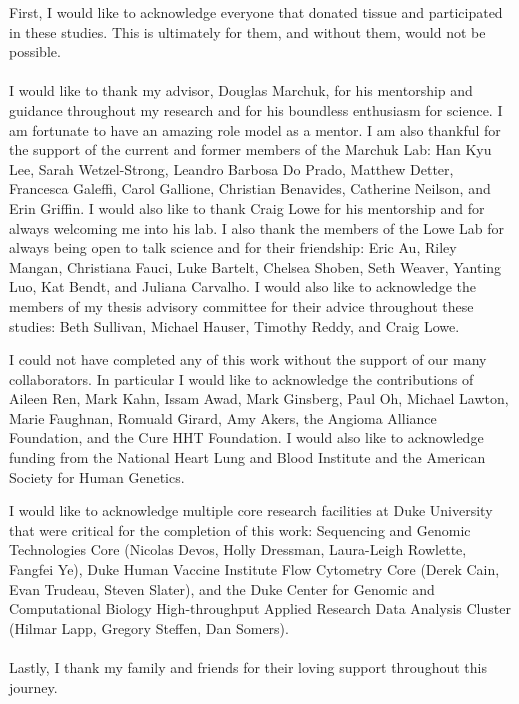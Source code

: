\acknowledgements
First, I would like to acknowledge everyone that donated tissue and participated in these studies. This is ultimately for them, and without them, would not be possible. 
\\ \\
I would like to thank my advisor, Douglas Marchuk, for his mentorship and guidance throughout my research and for his boundless enthusiasm for science. I am fortunate to have an amazing role model as a mentor. I am also thankful for the support of the current and former members of the Marchuk Lab: Han Kyu Lee, Sarah Wetzel-Strong, Leandro Barbosa Do Prado, Matthew Detter, Francesca Galeffi, Carol Gallione, Christian Benavides, Catherine Neilson, and Erin Griffin. I would also like to thank Craig Lowe for his mentorship and for always welcoming me into his lab. I also thank the members of the Lowe Lab for always being open to talk science and for their friendship: Eric Au, Riley Mangan, Christiana Fauci, Luke Bartelt, Chelsea Shoben, Seth Weaver, Yanting Luo, Kat Bendt, and Juliana Carvalho. I would also like to acknowledge the members of my thesis advisory committee for their advice throughout these studies: Beth Sullivan, Michael Hauser, Timothy Reddy, and Craig Lowe. 

I could not have completed any of this work without the support of our many collaborators. In particular I would like to acknowledge the contributions of Aileen Ren, Mark Kahn, Issam Awad, Mark Ginsberg, Paul Oh, Michael Lawton, Marie Faughnan, Romuald Girard, Amy Akers, the Angioma Alliance Foundation, and the Cure HHT Foundation. I would also like to acknowledge funding from the National Heart Lung and Blood Institute and the American Society for Human Genetics.

I would like to acknowledge multiple core research facilities at Duke University that were critical for the completion of this work: Sequencing and Genomic Technologies Core (Nicolas Devos, Holly Dressman, Laura-Leigh Rowlette, Fangfei Ye), Duke Human Vaccine Institute Flow Cytometry Core (Derek Cain, Evan Trudeau, Steven Slater), and the Duke Center for Genomic and Computational Biology High-throughput Applied Research Data Analysis Cluster (Hilmar Lapp, Gregory Steffen, Dan Somers). 
\\ \\
Lastly, I thank my family and friends for their loving support throughout this journey. 